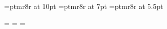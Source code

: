 
\font\tentimes=ptmr8r at 10pt
\font\seventimes=ptmr8r at 7pt
\font\fivetimes=ptmr8r at 5.5pt

=\tentimes
{}=\seventimes
{}=\fivetimes
\def\rm{\tentimes}
\rm











\bye
